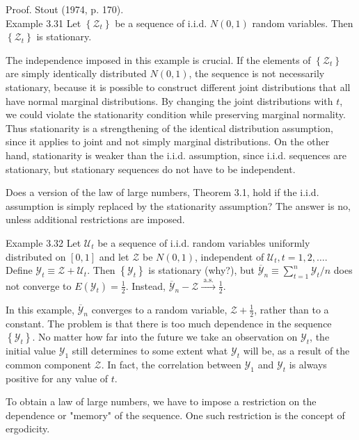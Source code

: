 \documentclass[10pt]{article}
\begin{document}
Proof. Stout (1974, p. 170).\\
Example 3.31 Let $\left\{\mathcal{Z}_{t}\right\}$ be a sequence of i.i.d. $N(0,1)$ random variables. Then $\left\{\mathcal{Z}_{t}\right\}$ is stationary.

The independence imposed in this example is crucial. If the elements of $\left\{\mathcal{Z}_{t}\right\}$ are simply identically distributed $N(0,1)$, the sequence is not necessarily stationary, because it is possible to construct different joint distributions that all have normal marginal distributions. By changing the joint distributions with $t$, we could violate the stationarity condition while preserving marginal normality. Thus stationarity is a strengthening of the identical distribution assumption, since it applies to joint and not simply marginal distributions. On the other hand, stationarity is weaker than the i.i.d. assumption, since i.i.d. sequences are stationary, but stationary sequences do not have to be independent.

Does a version of the law of large numbers, Theorem 3.1, hold if the i.i.d. assumption is simply replaced by the stationarity assumption? The answer is no, unless additional restrictions are imposed.

Example 3.32 Let $\mathcal{U}_{t}$ be a sequence of i.i.d. random variables uniformly distributed on $[0,1]$ and let $\mathcal{Z}$ be $N(0,1)$, independent of $\mathcal{U}_{t}, t=1,2, \ldots$. Define $\mathcal{Y}_{t} \equiv \mathcal{Z}+\mathcal{U}_{t}$. Then $\left\{\mathcal{Y}_{t}\right\}$ is stationary (why?), but $\overline{\mathcal{Y}}_{n} \equiv \sum_{t=1}^{n} \mathcal{Y}_{t} / n$ does not converge to $E\left(\mathcal{Y}_{t}\right)=\frac{1}{2}$. Instead, $\overline{\mathcal{Y}}_{n}-\mathcal{Z} \xrightarrow{\text { a.s. }} \frac{1}{2}$.

In this example, $\overline{\mathcal{Y}}_{n}$ converges to a random variable, $\mathcal{Z}+\frac{1}{2}$, rather than to a constant. The problem is that there is too much dependence in the sequence $\left\{\mathcal{Y}_{t}\right\}$. No matter how far into the future we take an observation on $\mathcal{Y}_{t}$, the initial value $\mathcal{Y}_{1}$ still determines to some extent what $\mathcal{Y}_{t}$ will be, as a result of the common component $\mathcal{Z}$. In fact, the correlation between $\mathcal{Y}_{1}$ and $\mathcal{Y}_{t}$ is always positive for any value of $t$.

To obtain a law of large numbers, we have to impose a restriction on the dependence or "memory" of the sequence. One such restriction is the concept of ergodicity.
\end{document}
